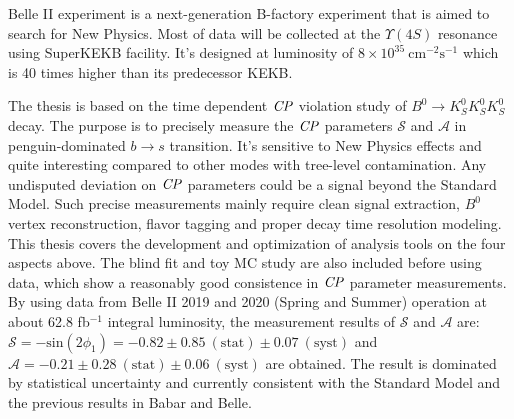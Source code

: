 % 
% 
%
Belle II experiment is a next-generation B-factory experiment that is aimed to search for New Physics. Most of data will be collected at the $\Upsilon(4S)$ resonance using SuperKEKB facility. It's designed at luminosity of $8 \times 10^{35}~ \text{cm}^{-2}\text{s}^{-1}$ which is 40 times higher than its predecessor KEKB.

The thesis is based on the time dependent $\it{CP}$ violation study of $B^0 \to K_S^0 K_S^0 K_S^0$ decay. The purpose is to precisely measure the $\it{CP}$ parameters $\mathcal{S}$ and $\mathcal{A}$ in penguin-dominated $b \to s$ transition. It's sensitive to New Physics effects and quite interesting compared to other modes with tree-level contamination. Any undisputed deviation on $\it{CP}$ parameters could be a signal beyond the Standard Model. Such precise measurements mainly require clean signal extraction, $B^0$ vertex reconstruction, flavor tagging and proper decay time resolution modeling. This thesis covers the development and optimization of analysis tools on the four aspects above. The blind fit and toy MC study are also included before using data, which show a reasonably good consistence in $\it{CP}$ parameter measurements. By using data from Belle II 2019 and 2020 (Spring and Summer) operation at about 62.8 fb$^{-1}$ integral luminosity, the measurement results of $\mathcal{S}$ and $\mathcal{A}$ are: $\mathcal{S}= - \text{sin}(2\phi_1) = -0.82 \pm 0.85 \: (\text{stat}) \pm 0.07 \: (\text{syst})$ and $\mathcal{A}= -0.21 \pm 0.28 \: (\text{stat}) \pm 0.06 \: (\text{syst})$ are obtained. The result is dominated by statistical uncertainty and currently consistent with the Standard Model and the previous results in Babar and Belle. 




 

